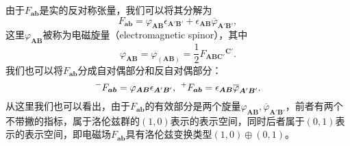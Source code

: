 由于$F_{\boldsymbol{ab}}$是实的反对称张量，我们可以将其分解为
\begin{equation}
	F_{\boldsymbol{ab}} =\varphi _{\boldsymbol{AB}} \epsilon _{\boldsymbol{A} '\boldsymbol{B} '} +\epsilon _{\boldsymbol{AB}}\overline{\varphi }_{\boldsymbol{A} '\boldsymbol{B} '} ,
	\label{eq:6.10}
\end{equation}
这里$\varphi _{\boldsymbol{AB}}$被称为电磁旋量（electromagnetic spinor），其中
\begin{equation*}
	\varphi _{\boldsymbol{AB}} =\varphi _{(\boldsymbol{AB})} =\frac{1}{2} F{_{\boldsymbol{ABC} '}}^{\boldsymbol{C} '} .
\end{equation*}
我们也可以将$F_{\boldsymbol{ab}}$分成自对偶部分和反自对偶部分：
\begin{equation*}
	\prescript{-}{}{} F_{\boldsymbol{ab}} =\varphi _{\boldsymbol{AB}} \epsilon _{\boldsymbol{A} '\boldsymbol{B} '} ,\kern+0.4em \prescript{+}{}{} F_{\boldsymbol{ab}} =\epsilon _{\boldsymbol{AB}}\overline{\varphi }_{\boldsymbol{A} '\boldsymbol{B} '} .
\end{equation*}
从这里我们也可以看出，由于$F_{\boldsymbol{ab}}$的有效部分是两个旋量$\varphi _{\boldsymbol{AB}} ,\overline{\varphi }_{\boldsymbol{A} '\boldsymbol{B} '}$，前者有两个不带撇的指标，属于洛伦兹群的$( 1,0)$表示的表示空间，同时后者属于$( 0,1)$表示的表示空间，即电磁场$F_{\boldsymbol{ab}}$具有洛伦兹变换类型$( 1,0) \oplus ( 0,1)$。

